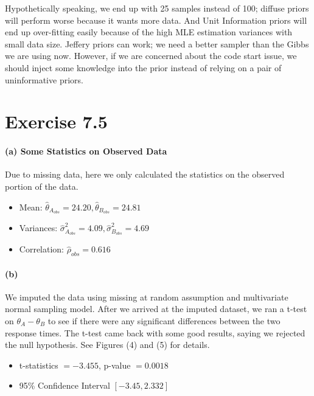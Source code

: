 \documentclass[11pt, letterpaper]{article}
\begin{document}
Hypothetically speaking, we end up with 25 samples instead of 100; diffuse priors will perform worse because it wants more data. And Unit Information priors will end up over-fitting easily because of the high MLE estimation variances with small data size. Jeffery priors can work; we need a better sampler than the Gibbs we are using now. However, if we are concerned about the code start issue, we should inject some knowledge into the prior instead of relying on a pair of uninformative priors.


\newpage
\section{Exercise 7.5}
\paragraph{(a) Some Statistics on Observed Data}
Due to missing data, here we only calculated the statistics on the observed portion of the data.
\begin{itemize}
    \item Mean: $\hat{\theta}_{A_{obs}} = 24.20, \hat{\theta}_{B_{obs}} = 24.81$
    \item Variances: $\hat{\sigma}^2_{A_{obs}} = 4.09, \hat{\sigma}^2_{B_{obs}} = 4.69$
    \item Correlation: $\hat{\rho}_{obs} = 0.616$
\end{itemize}

\paragraph{(b)}
We imputed the data using missing at random assumption and multivariate normal sampling model. After we arrived at the imputed dataset, we ran a t-test on $\theta_A - \theta_B$ to see if there were any significant differences between the two response times. The t-test came back with some good results, saying we rejected the null hypothesis. See Figures (4) and (5) for details.
\begin{itemize}
    \item t-statistics $= -3.455$, p-value $= 0.0018$
    \item 95\% Confidence Interval $[-3.45, 2.332]$
\end{itemize}
\end{document}
